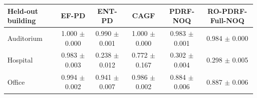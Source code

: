 \begin{tabular}{lccccc}
\toprule
Held-out building & EF-PD & ENT-PD & CAGF & PDRF-NOQ & RO-PDRF-Full-NOQ \\
\midrule
Auditorium & 1.000 $\pm$ 0.000 & 0.990 $\pm$ 0.001 & 1.000 $\pm$ 0.000 & 0.983 $\pm$ 0.001 & 0.984 $\pm$ 0.000 \\
Hospital & 0.983 $\pm$ 0.003 & 0.238 $\pm$ 0.012 & 0.772 $\pm$ 0.167 & 0.302 $\pm$ 0.004 & 0.298 $\pm$ 0.005 \\
Office & 0.994 $\pm$ 0.002 & 0.941 $\pm$ 0.007 & 0.986 $\pm$ 0.002 & 0.884 $\pm$ 0.006 & 0.887 $\pm$ 0.006 \\
\bottomrule
\end{tabular}

